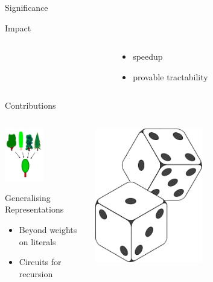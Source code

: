 \documentclass{beamer}
\begin{document}
\begin{frame}{Significance}
\begin{block}{Impact}
\begin{columns}
\begin{column}{0.1\textwidth}
      \end{column}
      \begin{column}{0.40\textwidth}
        \begin{itemize}
          \item \structure{$>100 \times$} speedup
          \item provable tractability
        \end{itemize}
      \end{column}
    \end{columns}
  \end{block}
\end{frame}

\begin{frame}{Contributions}
  \begin{columns}[t]
    \begin{column}{0.46\textwidth}
      \centering
      \includegraphics[width=0.5\textwidth]{trees.png}
      \begin{block}{Generalising Representations}
        \begin{itemize}
          \item Beyond weights on literals
          \item Circuits for recursion
        \end{itemize}
      \end{block}
    \end{column}
    \begin{column}{0.54\textwidth}
      \centering
      \includegraphics[width=0.5\textwidth]{dice}

\end{column}
\end{columns}
\end{frame}
\end{document}
